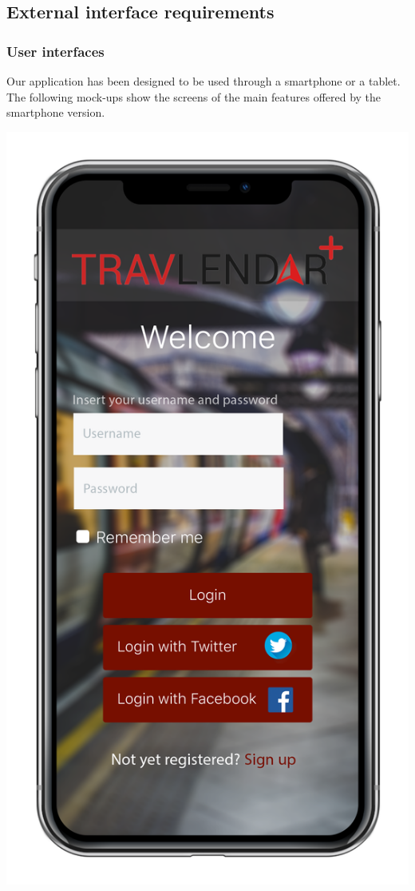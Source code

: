 \documentclass[12pt,titlepage]{article}
\begin{document}
\subsection{External interface requirements}\label{sec:mod1}
\subsubsection{User interfaces}\label{sec:mod1}
Our application has been designed to be used through a smartphone or a tablet.
The following mock-ups show the screens of the main features offered by the smartphone version. 

\includegraphics[scale=0.15]{"iPhoneX_mockup LOGIN"} 
\end{document}
